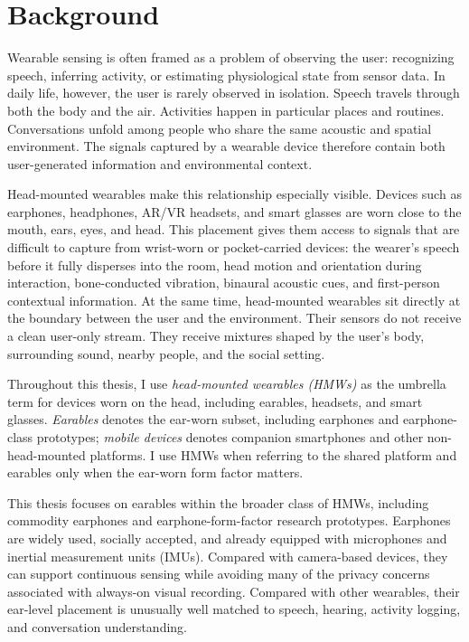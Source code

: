 \section{Background}

Wearable sensing is often framed as a problem of observing the user: recognizing speech, inferring activity, or estimating physiological state from sensor data. In daily life, however, the user is rarely observed in isolation. Speech travels through both the body and the air. Activities happen in particular places and routines. Conversations unfold among people who share the same acoustic and spatial environment. The signals captured by a wearable device therefore contain both user-generated information and environmental context.

Head-mounted wearables make this relationship especially visible. Devices such as earphones, headphones, AR/VR headsets, and smart glasses are worn close to the mouth, ears, eyes, and head. This placement gives them access to signals that are difficult to capture from wrist-worn or pocket-carried devices: the wearer's speech before it fully disperses into the room, head motion and orientation during interaction, bone-conducted vibration, binaural acoustic cues, and first-person contextual information. At the same time, head-mounted wearables sit directly at the boundary between the user and the environment. Their sensors do not receive a clean user-only stream. They receive mixtures shaped by the user's body, surrounding sound, nearby people, and the social setting.

Throughout this thesis, I use \textit{head-mounted wearables (HMWs)} as the umbrella term for devices worn on the head, including earables, headsets, and smart glasses. \textit{Earables} denotes the ear-worn subset, including earphones and earphone-class prototypes; \textit{mobile devices} denotes companion smartphones and other non-head-mounted platforms. I use HMWs when referring to the shared platform and earables only when the ear-worn form factor matters.

This thesis focuses on earables within the broader class of HMWs, including commodity earphones and earphone-form-factor research prototypes. Earphones are widely used, socially accepted, and already equipped with microphones and inertial measurement units (IMUs). Compared with camera-based devices, they can support continuous sensing while avoiding many of the privacy concerns associated with always-on visual recording. Compared with other wearables, their ear-level placement is unusually well matched to speech, hearing, activity logging, and conversation understanding.

